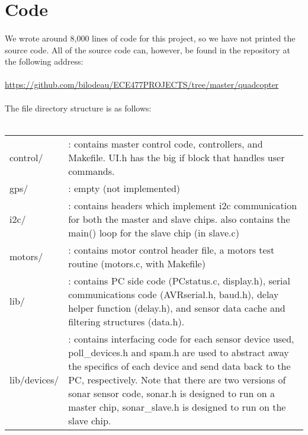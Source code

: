 \section{Code}
\paragraph{}
We wrote around 8,000 lines of code for this project, so we have not printed the source code.  All of the source code can, however, be found in the repository at the following address:\\\\
\url{https://github.com/bilodeau/ECE477PROJECTS/tree/master/quadcopter}\\
\paragraph{}
The file directory structure is as follows:\\\\
\begin{tabular}{l p{6in}}
control/ &: contains master control code, controllers, and Makefile.  UI.h has the big if block that handles user commands.\\
gps/ &: empty (not implemented)\\
i2c/ &: contains headers which implement i2c communication for both the master and slave chips.  also contains the main() loop for the slave chip (in slave.c)\\
motors/ &: contains motor control header file, a motors test routine (motors.c, with Makefile)\\
lib/ &: contains PC side code (PCstatus.c, display.h), serial communications code (AVRserial.h, baud.h), delay helper function (delay.h), and sensor data cache and filtering structures (data.h).\\
lib/devices/ &: contains interfacing code for each sensor device used, poll\_devices.h and spam.h are used to abstract away the specifics of each device and send data back to the PC, respectively.  Note that there are two versions of sonar sensor code, sonar.h is designed to run on a master chip, sonar\_slave.h is designed to run on the slave chip.\\
\end{tabular}
